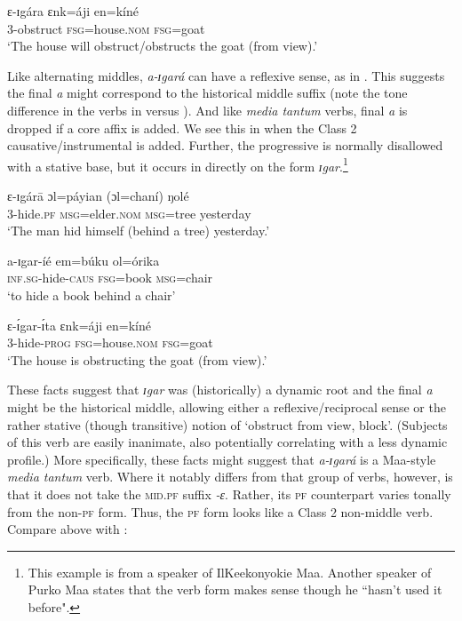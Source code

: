 \documentclass[output=paper,colorlinks,citecolor=brown
]{langscibook}
\begin{document}
\ea \label{ex:Payne:obstruct}
\gll ɛ-ɪgára ɛnk=áji en=kíné  \\
3-obstruct \textsc{fsg}=house.\textsc{nom} \textsc{fsg}=goat\\
\glt `The house will obstruct/obstructs the goat (from view).'
\z 

Like alternating middles, \textit{a-ɪgará} can have a reflexive sense, as in . This suggests the final \textit{a} might correspond to the historical middle suffix (note the tone difference in the verbs in  versus ). And like \textit{media tantum} verbs, final \textit{a} is dropped if a core affix is added. We see this in  when the Class 2 causative/instrumental is added. Further, the progressive is normally disallowed with a stative base, but it occurs in  directly on the form \textit{ɪgar}.\footnote{This example is from a speaker of IlKeekonyokie Maa. Another speaker of Purko Maa states that the verb form makes sense though he ``hasn't used it before".} 

\ea \label{ex:Payne:obstruct-refl}
\gll  	ɛ-ɪgárā		ɔl=páyian (ɔl=chaní) ŋolé \\	
3-hide.\textsc{pf}	\textsc{msg}=elder.\textsc{nom} \textsc{msg}=tree yesterday \\
\glt `The man hid himself (behind a tree) yesterday.'\\
\z

\ea \label{ex:Payne:obstruct-caus}
\gll	a-ɪgar-íé		em=búku	ol=órika 	\\
\textsc{inf.sg}-hide-\textsc{caus}	\textsc{fsg}=book	\textsc{msg}=chair	\\
\glt ‘to hide a book behind a chair’
\z

\ea \label{ex:Payne:obstruct-prog}
\gll ɛ-ɪ́gar-ɪ́ta	ɛnk=áji	en=kíné  \\
 3-hide-\textsc{prog}	\textsc{fsg}=house.\textsc{nom}	\textsc{fsg}=goat\\
 \glt ‘The house is obstructing the goat (from view).’
 \z 

These facts suggest that \textit{ɪgar} was (historically) a dynamic root and the final \textit{a} might be the historical middle, allowing either a reflexive/reciprocal sense or the rather stative (though transitive) notion of ‘obstruct from view, block’. (Subjects of this verb are easily inanimate, also potentially correlating with a less dynamic profile.) More specifically, these facts might suggest that \textit{a-ɪgará} is a Maa-style \textit{media tantum} verb. Where it notably differs from that group of verbs, however, is that it does not take the \textsc{mid.pf} suffix \textit{-ɛ}. Rather, its \textsc{pf} counterpart varies tonally from the non-\textsc{pf} form. Thus, the \textsc{pf} form looks like a Class 2 non-middle verb. Compare  above with :
\end{document}
